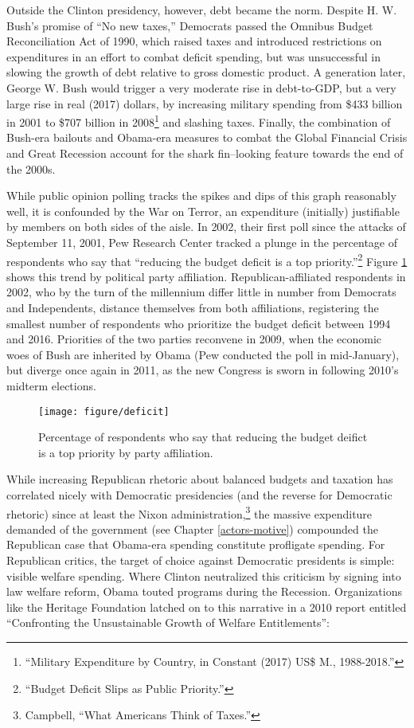 \documentclass[
]{article}
\begin{document}
Outside the Clinton presidency, however, debt became the norm.
Despite H. W. Bush's promise of ``No new taxes,'' Democrats passed the Omnibus Budget Reconciliation Act of 1990, which raised taxes and introduced restrictions on expenditures in an effort to combat deficit spending, but was unsuccessful in slowing the growth of debt relative to gross domestic product.
A generation later, George W. Bush would trigger a very moderate rise in debt-to-GDP, but a very large rise in real (2017) dollars, by increasing military spending from \$433 billion in 2001 to \$707 billion in 2008\footnote{``Military Expenditure by Country, in Constant (2017) US\$ M., 1988-2018.''} and slashing taxes.
Finally, the combination of Bush-era bailouts and Obama-era measures to combat the Global Financial Crisis and Great Recession account for the shark fin--looking feature towards the end of the 2000s.

While public opinion polling tracks the spikes and dips of this graph reasonably well, it is confounded by the War on Terror, an expenditure (initially) justifiable by members on both sides of the aisle.
In 2002, their first poll since the attacks of September 11, 2001, Pew Research Center tracked a plunge in the percentage of respondents who say that ``reducing the budget deficit is a top priority.''\footnote{``Budget Deficit Slips as Public Priority.''}
Figure \ref{fig:deficit} shows this trend by political party affiliation.
Republican-affiliated respondents in 2002, who by the turn of the millennium differ little in number from Democrats and Independents, distance themselves from both affiliations, registering the smallest number of respondents who prioritize the budget deficit between 1994 and 2016.
Priorities of the two parties reconvene in 2009, when the economic woes of Bush are inherited by Obama (Pew conducted the poll in mid-January), but diverge once again in 2011, as the new Congress is sworn in following 2010's midterm elections.

\begin{figure}

{\centering \texttt{[image: figure/deficit]}

}

\caption{Percentage of respondents who say that reducing the budget deifict is a top priority by party affiliation.}\label{fig:deficit}
\end{figure}

While increasing Republican rhetoric about balanced budgets and taxation has correlated nicely with Democratic presidencies (and the reverse for Democratic rhetoric) since at least the Nixon administration,\footnote{Campbell, ``What Americans Think of Taxes.''} the massive expenditure demanded of the government (see Chapter \ref{actors-motive}) compounded the Republican case that Obama-era spending constitute profligate spending.
For Republican critics, the target of choice against Democratic presidents is simple: visible welfare spending.
Where Clinton neutralized this criticism by signing into law welfare reform, Obama touted programs during the Recession.
Organizations like the Heritage Foundation latched on to this narrative in a 2010 report entitled ``Confronting the Unsustainable Growth of Welfare Entitlements'':
\end{document}
